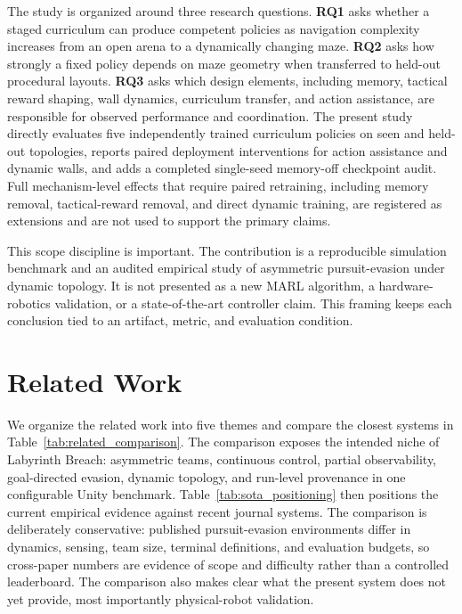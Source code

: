 \documentclass[journal]{IEEEtran}
\begin{document}
The study is organized around three research questions. \textbf{RQ1} asks whether a staged curriculum can produce competent policies as navigation complexity increases from an open arena to a dynamically changing maze. \textbf{RQ2} asks how strongly a fixed policy depends on maze geometry when transferred to held-out procedural layouts. \textbf{RQ3} asks which design elements, including memory, tactical reward shaping, wall dynamics, curriculum transfer, and action assistance, are responsible for observed performance and coordination. The present study directly evaluates five independently trained curriculum policies on seen and held-out topologies, reports paired deployment interventions for action assistance and dynamic walls, and adds a completed single-seed memory-off checkpoint audit. Full mechanism-level effects that require paired retraining, including memory removal, tactical-reward removal, and direct dynamic training, are registered as extensions and are not used to support the primary claims.

This scope discipline is important. The contribution is a reproducible simulation benchmark and an audited empirical study of asymmetric pursuit-evasion under dynamic topology. It is not presented as a new MARL algorithm, a hardware-robotics validation, or a state-of-the-art controller claim. This framing keeps each conclusion tied to an artifact, metric, and evaluation condition.

\section{Related Work}

We organize the related work into five themes and compare the closest systems in Table~\ref{tab:related_comparison}. The comparison exposes the intended niche of Labyrinth Breach: asymmetric teams, continuous control, partial observability, goal-directed evasion, dynamic topology, and run-level provenance in one configurable Unity benchmark. Table~\ref{tab:sota_positioning} then positions the current empirical evidence against recent journal systems. The comparison is deliberately conservative: published pursuit-evasion environments differ in dynamics, sensing, team size, terminal definitions, and evaluation budgets, so cross-paper numbers are evidence of scope and difficulty rather than a controlled leaderboard. The comparison also makes clear what the present system does not yet provide, most importantly physical-robot validation.
\end{document}
